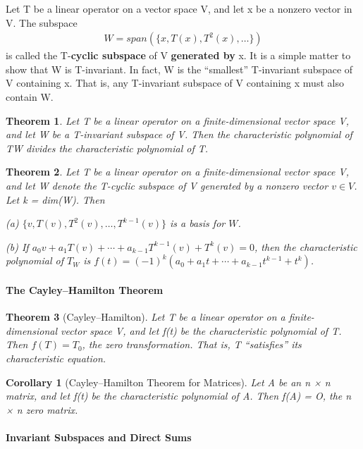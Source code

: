 \documentclass{article}
\newcommand{\bd}[1]{\textbf{#1}}
\theoremstyle{plain}
\newtheorem{theorem}{Theorem}[section]
\newtheorem*{corollary}{Corollary}
\theoremstyle{plain} %
\begin{document}
Let T be a linear operator on a vector space V, and let x be a nonzero vector in V. The subspace
\begin{align*}
  W=span(\{x,T(x),T^2(x),\ldots\})
\end{align*}
is called the T-\bd{cyclic subspace} of V \bd{generated by} x. It is a simple matter to show that W is T-invariant. In fact, W is the “smallest” T-invariant subspace of V containing x. That is, any T-invariant subspace of V containing x must also contain W.

\begin{theorem}
  Let T be a linear operator on a finite-dimensional vector space V, and let W be a T-invariant subspace of V. Then the characteristic polynomial of TW divides the characteristic polynomial of T.
\end{theorem}

\begin{theorem}
  Let T be a linear operator on a finite-dimensional vector space V, and let W denote the T-cyclic subspace of V generated by a nonzero vector $v \in V$. Let k = dim(W). Then

  (a) $\{v,T(v), T^2(v), \ldots, T^{k-1}(v)\}$ is a basis for $W$.

  (b) If $a_0v +a_1T(v)+\cdots+a_{k−1}T^{k−1}(v)+T^k(v) = 0$, then the characteristic   polynomial of $T_W$ is $f(t)=(−1)^{k}(a_0 + a_1t + \cdots + a_{k−1}t^{k−1} + t^k)$.
\end{theorem}

\paragraph{The Cayley–Hamilton Theorem}

\begin{theorem}[Cayley–Hamilton]
  Let T be a linear operator on a finite-dimensional vector space V, and let f(t) be the characteristic polynomial of T. Then $f(T) = T_0$, the zero transformation. That is, T “satisfies” its characteristic equation.
\end{theorem}

\begin{corollary}[Cayley–Hamilton Theorem for Matrices]
  Let A be an n × n matrix, and let f(t) be the characteristic polynomial of A. Then f(A) = O, the n × n zero matrix.
\end{corollary}

\paragraph {Invariant Subspaces and Direct Sums}
\end{document}
